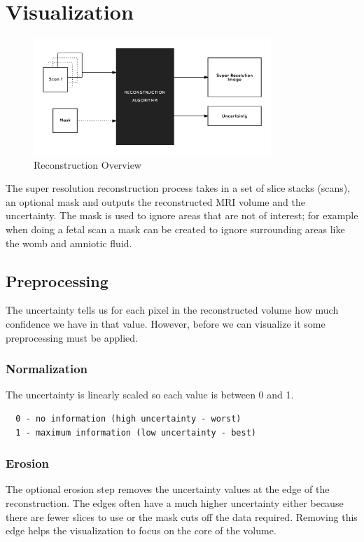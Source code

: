 \chapter{Visualization}

\begin{figure}[h]
  \centering
  \includegraphics[width=0.8\textwidth]{images/reconstruction_overview.png}
  \caption{Reconstruction Overview}
  \label{fig:erosionbefore}
\end{figure}

The super resolution reconstruction process takes in a set of slice stacks (scans), an optional mask and outputs the reconstructed MRI volume and the uncertainty. The mask is used to ignore areas that are not of interest; for example when doing a fetal scan a mask can be created to ignore surrounding areas like the womb and amniotic fluid.

\section{Preprocessing}\label{section:preprocessing}
The uncertainty tells us for each pixel in the reconstructed volume how much confidence we have in that value. However, before we can visualize it some preprocessing must be applied. 

\subsection{Normalization}
The uncertainty is linearly scaled so each value is between 0 and 1.

\begin{verbatim}
  0 - no information (high uncertainty - worst)
  1 - maximum information (low uncertainty - best)
\end{verbatim}

\subsection{Erosion}
The optional erosion step removes the uncertainty values at the edge of the reconstruction. The edges often have a much higher uncertainty either because there are fewer slices to use or the mask cuts off the data required. Removing this edge helps the visualization to focus on the core of the volume.

